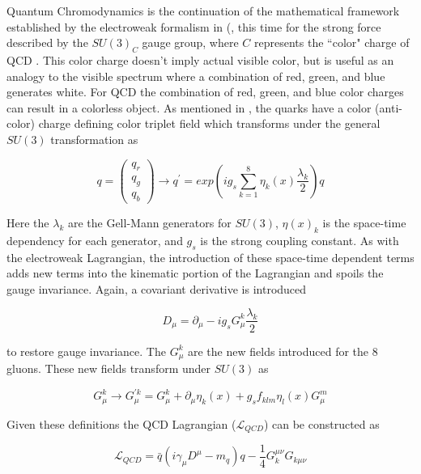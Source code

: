 
Quantum Chromodynamics is the continuation of the mathematical framework
established by the electroweak formalism in (, this time
for the strong force described by the $SU(3)_C$ gauge group, where $C$
represents the ``color" charge of QCD \cite{Campbell:2017hsr}.  This
color charge doesn't imply actual visible color, but is useful as an analogy to
the visible spectrum where a combination of red, green, and blue generates
white.  For QCD the combination of red, green, and blue color charges can
result in a colorless object.  As mentioned in , the
quarks have a color (anti-color) charge defining color triplet field which
transforms under the general $SU(3)$ transformation as

\begin{equation}
q = \left( \begin{matrix} q_{r} \\ q_{g} \\ q_{b} \end{matrix} \right)
\rightarrow q^{'} = exp \left( ig_{s} \sum_{k=1}^{8} \eta_{k}(x)
\frac{\lambda_k}{2} \right) q
\end{equation}

Here the $\lambda_{k}$ are the Gell-Mann generators for $SU(3)$, $\eta(x)_{k}$ is the
space-time dependency for each generator, and  $g_s$ is the strong coupling constant.
As with the electroweak Lagrangian, the introduction of these space-time dependent terms adds new
terms into the kinematic portion of the Lagrangian and spoils the gauge 
invariance.  Again, a covariant derivative is introduced 

\begin{equation}
D_{\mu} = \partial_{\mu} - ig_{s}G_{\mu}^{k}\frac{\lambda_{k}}{2}
\end{equation}

to restore gauge invariance. The $G_{\mu}^{k}$ are the new fields introduced
for the 8 gluons.  These new fields transform under $SU(3)$ as

\begin{equation} \label{eq:qcd:gluon_field}
G_{\mu}^{k} \rightarrow G_{\mu}^{'k} = G_{\mu}^{k} + \partial_{\mu}\eta_{k}(x) +
g_{s}f_{klm}\eta_{l}(x)G_{\mu}^{m}
\end{equation}

Given these definitions the QCD Lagrangian ($\mathcal{L}_{QCD}$) can be
constructed as 

\begin{equation} \label{eq:qcd:qcd_lagrangian}
\mathcal{L}_{QCD} = \bar{q}(i\gamma_{\mu}D^{\mu} - m_{q})q -
\frac{1}{4}G_{k}^{\mu\nu}G_{k\mu\nu}
\end{equation}

